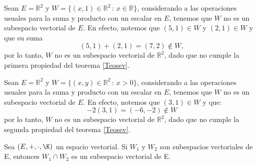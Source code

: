 \documentclass[compacto,10pt]{pubciencias-notas}
\begin{document}

\begin{ejem}\hspace{0pt} Sean $E=\mathbb{R}^{2}$ y $W=\{(x,1)\in \mathbb{R}^{2}\,:\, x \in \mathbb{R}\}$, considerando a las operaciones usuales para la suma y producto con un escalar en $E$, tenemos que $W$ no es un subespacio vectorial de $E$. En efecto, notemos que $(5,1)\in W$ y $(2,1)\in W$ y que su suma
\[
    (5,1)+(2,1)=(7,2) \notin W,
\]
por lo tanto, $W$ no es un subespacio vectorial de $\mathbb{R}^{2}$, dado que no cumple la primera propiedad del teorema \ref{Teosev}.
\end{ejem}

\begin{ejem}
Sean $E=\mathbb{R}^{2}$ y $W=\{(x,y)\in \mathbb{R}^{2}\,:\,x>0\}$, considerando a las operaciones usuales para la suma y producto con un escalar en $E$, tenemos que $W$ no es un subespacio vectorial de $E$. En efecto, notemos que $(3,1)\in W$ y que:
\[
    -2(3,1)=(-6,-2)\notin W
\]
por lo tanto, $W$ no es un subespacio vectorial de $\mathbb{R}^{2}$, dado que no cumple la segunda propiedad del teorema \ref{Teosev}.
\end{ejem}

\begin{teo}
    Sea $(E, +, \cdot, \K)$ un espacio vectorial. Si $W_{1}$ y $W_{2}$ son subespacios vectoriales de E, entonces $W_{1} \cap W_{2}$ es un subespacio vectorial de E.
\end{teo}

\end{document}
